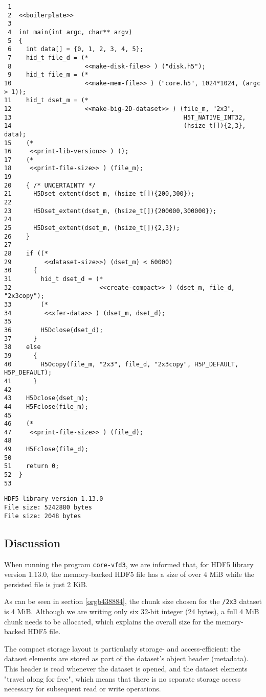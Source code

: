 \documentclass[a4paper, 12pt]{article}
\begin{document}
\begin{verbatim}
 1
 2  <<boilerplate>>
 3
 4  int main(int argc, char** argv)
 5  {
 6    int data[] = {0, 1, 2, 3, 4, 5};
 7    hid_t file_d = (*
 8                    <<make-disk-file>> ) ("disk.h5");
 9    hid_t file_m = (*
10                    <<make-mem-file>> ) ("core.h5", 1024*1024, (argc > 1));
11    hid_t dset_m = (*
12                    <<make-big-2D-dataset>> ) (file_m, "2x3",
13                                               H5T_NATIVE_INT32,
14                                               (hsize_t[]){2,3}, data);
15    (*
16     <<print-lib-version>> ) ();
17    (*
18     <<print-file-size>> ) (file_m);
19
20    { /* UNCERTAINTY */
21      H5Dset_extent(dset_m, (hsize_t[]){200,300});
22
23      H5Dset_extent(dset_m, (hsize_t[]){200000,300000});
24
25      H5Dset_extent(dset_m, (hsize_t[]){2,3});
26    }
27
28    if ((*
29         <<dataset-size>>) (dset_m) < 60000)
30      {
31        hid_t dset_d = (*
32                        <<create-compact>> ) (dset_m, file_d, "2x3copy");
33        (*
34         <<xfer-data>> ) (dset_m, dset_d);
35
36        H5Dclose(dset_d);
37      }
38    else
39      {
40        H5Ocopy(file_m, "2x3", file_d, "2x3copy", H5P_DEFAULT, H5P_DEFAULT);
41      }
42
43    H5Dclose(dset_m);
44    H5Fclose(file_m);
45
46    (*
47     <<print-file-size>> ) (file_d);
48
49    H5Fclose(file_d);
50
51    return 0;
52  }
53
\end{verbatim}

\begin{verbatim}
HDF5 library version 1.13.0
File size: 5242880 bytes
File size: 2048 bytes
\end{verbatim}

\subsection{Discussion}
\label{sec:org8bc5377}

When running the program \texttt{core-vfd3}, we are informed that, for HDF5 library
version 1.13.0, the memory-backed HDF5 file has a size of over 4 MiB while the
persisted file is just 2 KiB.

As can be seen in section \ref{orgb438884}, the chunk size chosen for
the \texttt{/2x3} dataset is 4 MiB. Although we are writing only six 32-bit integer
(24 bytes), a full 4 MiB chunk needs to be allocated, which explains the
overall size for the memory-backed HDF5 file.

The compact storage layout is particularly storage- and access-efficient: the
dataset elements are stored as part of the dataset's object header
(metadata). This header is read whenever the dataset is opened, and the dataset
elements "travel along for free", which means that there is no separate storage
access necessary for subsequent read or write operations.
\end{document}
